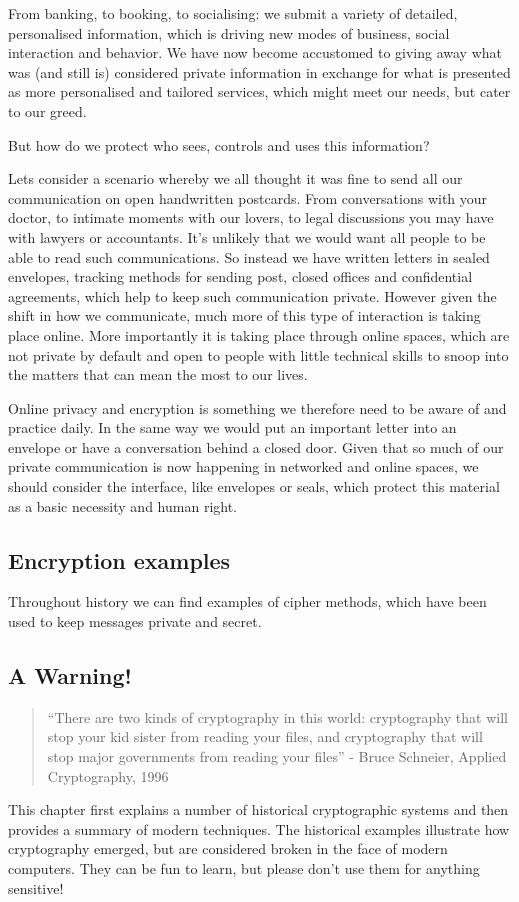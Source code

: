 From banking, to booking, to socialising: we submit a variety of
detailed, personalised information, which is driving new modes of
business, social interaction and behavior. We have now become accustomed
to giving away what was (and still is) considered private information in
exchange for what is presented as more personalised and tailored
services, which might meet our needs, but cater to our greed.

But how do we protect who sees, controls and uses this information?

Lets consider a scenario whereby we all thought it was fine to send all
our communication on open handwritten postcards. From conversations with
your doctor, to intimate moments with our lovers, to legal discussions
you may have with lawyers or accountants. It's unlikely that we would
want all people to be able to read such communications. So instead we
have written letters in sealed envelopes, tracking methods for sending
post, closed offices and confidential agreements, which help to keep
such communication private. However given the shift in how we
communicate, much more of this type of interaction is taking place
online. More importantly it is taking place through online spaces, which
are not private by default and open to people with little technical
skills to snoop into the matters that can mean the most to our lives.

Online privacy and encryption is something we therefore need to be aware
of and practice daily. In the same way we would put an important letter
into an envelope or have a conversation behind a closed door. Given that
so much of our private communication is now happening in networked and
online spaces, we should consider the interface, like envelopes or
seals, which protect this material as a basic necessity and human right.

\subsection{Encryption examples}

Throughout history we can find examples of cipher methods, which have
been used to keep messages private and secret.

\subsection{A Warning!}

\begin{quote}
``There are two kinds of cryptography in this world: cryptography that
will stop your kid sister from reading your files, and cryptography that
will stop major governments from reading your files'' - Bruce Schneier,
Applied Cryptography, 1996

\end{quote}
This chapter first explains a number of historical cryptographic systems
and then provides a summary of modern techniques. The historical
examples illustrate how cryptography emerged, but are considered broken
in the face of modern computers. They can be fun to learn, but please
don't use them for anything sensitive!

